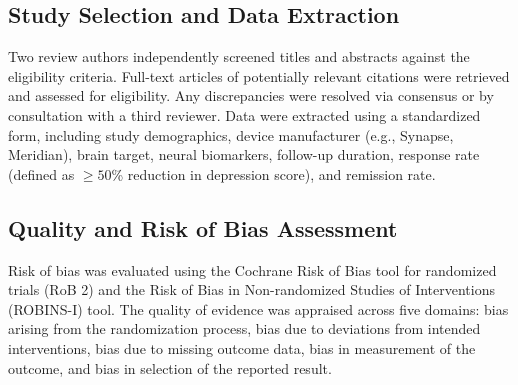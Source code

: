 \subsection{Study Selection and Data Extraction}
Two review authors independently screened titles and abstracts against the eligibility criteria. Full-text articles of potentially relevant citations were retrieved and assessed for eligibility. Any discrepancies were resolved via consensus or by consultation with a third reviewer. Data were extracted using a standardized form, including study demographics, device manufacturer (e.g., Synapse, Meridian), brain target, neural biomarkers, follow-up duration, response rate (defined as $\ge 50$\% reduction in depression score), and remission rate.

\subsection{Quality and Risk of Bias Assessment}
Risk of bias was evaluated using the Cochrane Risk of Bias tool for randomized trials (RoB 2) and the Risk of Bias in Non-randomized Studies of Interventions (ROBINS-I) tool. The quality of evidence was appraised across five domains: bias arising from the randomization process, bias due to deviations from intended interventions, bias due to missing outcome data, bias in measurement of the outcome, and bias in selection of the reported result.
